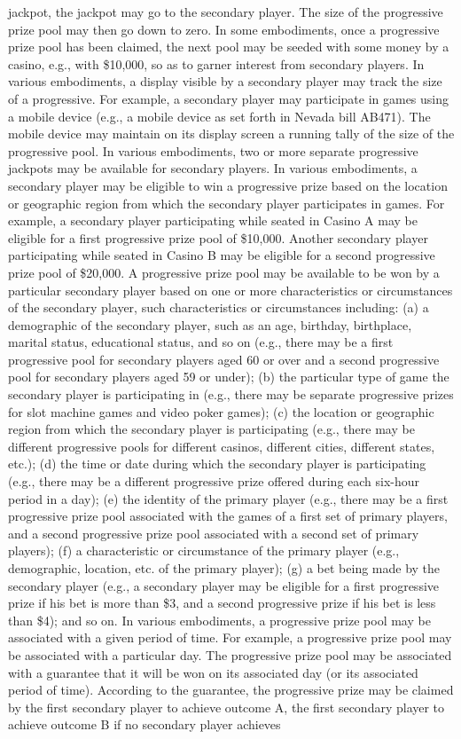 \documentclass[11pt,a4paper]{article}
\begin{document}
jackpot, the jackpot may go to the secondary player. The size of the progressive prize pool may then go down to zero. In some embodiments, once a progressive prize pool has been claimed, the next pool may be seeded with some money by a casino, e.g., with \$10,000, so as to garner interest from secondary players. In various embodiments, a display visible by a secondary player may track the size of a progressive. For example, a secondary player may participate in games using a mobile device (e.g., a mobile device as set forth in Nevada bill AB471). The mobile device may maintain on its display screen a running tally of the size of the progressive pool. In various embodiments, two or more separate progressive jackpots may be available for secondary players. In various embodiments, a secondary player may be eligible to win a progressive prize based on the location or geographic region from which the secondary player participates in games. For example, a secondary player participating while seated in Casino A may be eligible for a first progressive prize pool of \$10,000. Another secondary player participating while seated in Casino B may be eligible for a second progressive prize pool of \$20,000. A progressive prize pool may be available to be won by a particular secondary player based on one or more characteristics or circumstances of the secondary player, such characteristics or circumstances including: (a) a demographic of the secondary player, such as an age, birthday, birthplace, marital status, educational status, and so on (e.g., there may be a first progressive pool for secondary players aged 60 or over and a second progressive pool for secondary players aged 59 or under); (b) the particular type of game the secondary player is participating in (e.g., there may be separate progressive prizes for slot machine games and video poker games); (c) the location or geographic region from which the secondary player is participating (e.g., there may be different progressive pools for different casinos, different cities, different states, etc.); (d) the time or date during which the secondary player is participating (e.g., there may be a different progressive prize offered during each six-hour period in a day); (e) the identity of the primary player (e.g., there may be a first progressive prize pool associated with the games of a first set of primary players, and a second progressive prize pool associated with a second set of primary players); (f) a characteristic or circumstance of the primary player (e.g., demographic, location, etc. of the primary player); (g) a bet being made by the secondary player (e.g., a secondary player may be eligible for a first progressive prize if his bet is more than \$3, and a second progressive prize if his bet is less than \$4); and so on. In various embodiments, a progressive prize pool may be associated with a given period of time. For example, a progressive prize pool may be associated with a particular day. The progressive prize pool may be associated with a guarantee that it will be won on its associated day (or its associated period of time). According to the guarantee, the progressive prize may be claimed by the first secondary player to achieve outcome A, the first secondary player to achieve outcome B if no secondary player achieves 
\end{document}
